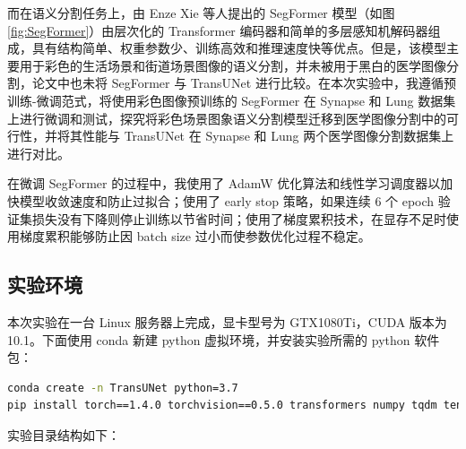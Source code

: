 \documentclass[hyperref,a4paper,UTF8]{ctexart}
\begin{document}
而在语义分割任务上，由 Enze Xie 等人提出的 SegFormer 模型\cite{SegFormer}（如图 \ref{fig:SegFormer}）由层次化的 Transformer 编码器和简单的多层感知机解码器组成，具有结构简单、权重参数少、训练高效和推理速度快等优点。但是，该模型主要用于彩色的生活场景和街道场景图像的语义分割，并未被用于黑白的医学图像分割，论文中也未将 SegFormer 与 TransUNet 进行比较。在本次实验中，我遵循预训练-微调范式，将使用彩色图像预训练的 SegFormer 在 Synapse 和 Lung 数据集上进行微调和测试，探究将彩色场景图象语义分割模型迁移到医学图像分割中的可行性，并将其性能与 TransUNet 在 Synapse 和 Lung 两个医学图像分割数据集上进行对比。

在微调 SegFormer 的过程中，我使用了 AdamW 优化算法和线性学习调度器以加快模型收敛速度和防止过拟合；使用了 early stop 策略，如果连续 6 个 epoch 验证集损失没有下降则停止训练以节省时间；使用了梯度累积技术，在显存不足时使用梯度累积能够防止因 batch size 过小而使参数优化过程不稳定。

\subsection{实验环境}

本次实验在一台 Linux 服务器上完成，显卡型号为 GTX1080Ti，CUDA 版本为 10.1。下面使用 conda 新建 python 虚拟环境，并安装实验所需的 python 软件包：

\begin{lstlisting}[language=bash]
conda create -n TransUNet python=3.7
pip install torch==1.4.0 torchvision==0.5.0 transformers numpy tqdm tensorboard tensorboardX ml-collections medpy SimpleITK scipy nibabel h5py matplotlib datasets
\end{lstlisting}

实验目录结构如下：

\begin{minipage}[c]{0.8\linewidth}
\end{minipage}
\end{document}
